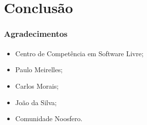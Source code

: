\documentclass{beamer}
\begin{document}
  \section{Conclusão}

  \begin{frame}
    \frametitle{Agradecimentos}
    \framesubtitle{}
  
    \begin{itemize}
      \item Centro de Competência em Software Livre;
      \item Paulo Meirelles;
      \item Carlos Morais;
      \item João da Silva;
      \item Comunidade Noosfero.
    \end{itemize}
  \end{frame}
\end{document}
